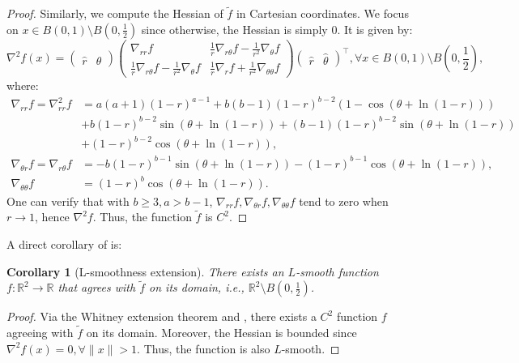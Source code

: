 \documentclass{article}
\theoremstyle{plain}
\newtheorem{corollary}[theorem]{Corollary}
\theoremstyle{definition}
\theoremstyle{remark}
\newcommand*{\RR}{\mathbb{R}}
\begin{document}
\begin{proof}
    Similarly, we compute the Hessian of $\tilde{f}$ in Cartesian coordinates.
    We focus on $x \in B(0,1) \setminus B\left(0, \frac{1}{2}\right)$ since otherwise, the Hessian is simply $0$. It is given by:
    \begin{equation*}
        \nabla^2 f(x) = \begin{pmatrix}
            \hat{r} & \hat{\theta}
        \end{pmatrix} \begin{pmatrix}
            \nabla_{rr} f & \frac{1}{r} \nabla_{r\theta} f - \frac{1}{r^2} \nabla_\theta f\\
            \frac{1}{r} \nabla_{r\theta} f - \frac{1}{r^2} \nabla_\theta f & \frac{1}{r} \nabla_r f + \frac{1}{r^2}\nabla_{\theta\theta} f
        \end{pmatrix}\begin{pmatrix}
            \hat{r} & \hat{\theta}
        \end{pmatrix}^\top,\forall x \in B(0,1) \setminus B\left(0, \frac{1}{2}\right),
    \end{equation*}
    where:
    \begin{equation*}
        \begin{aligned}
            \nabla_{rr} f = \nabla_{rr}^2 f &= a(a+1)(1-r)^{a - 1} + b(b-1)(1-r)^{b - 2}(1 - \cos(\theta + \ln(1-r)))\\ 
            &+ b(1-r)^{b-2}\sin(\theta + \ln(1-r)) + (b-1)(1-r)^{b-2}\sin(\theta + \ln(1 - r))\\
            &+ (1-r)^{b-2}\cos(\theta + \ln(1-r)),\\
            \nabla_{\theta r} f = \nabla_{r\theta} f &= -b(1-r)^{b-1}\sin(\theta + \ln(1-r)) - (1-r)^{b-1}\cos(\theta + \ln(1-r)),\\
            \nabla_{\theta\theta} f &= (1-r)^b \cos(\theta + \ln(1-r)).
        \end{aligned}
    \end{equation*}
    One can verify that with $b \geq 3, a > b - 1$, $\nabla_{rr} f, \nabla_{\theta r} f, \nabla_{\theta\theta} f$ tend to zero when $r \to 1$, hence $\nabla^2 f$. Thus, the function $\tilde{f}$ is $C^2$. 
\end{proof}

A direct corollary of  is:
\begin{corollary}[L-smoothness extension]\label{cor:L-smoothness}
    There exists an $L$-smooth function $f: \RR^2 \to \RR$ that agrees with $\tilde{f}$ on its domain, i.e., $\RR^2 \setminus B\left(0,\frac{1}{2}\right)$. 
\end{corollary}
\begin{proof}
    Via the Whitney extension theorem \citep{whitney1934analytic} and , there exists a $C^2$ function $f$ agreeing with $\tilde{f}$ on its domain. Moreover, the Hessian is bounded since $\nabla^2 f (x) = 0, \forall \|x\| > 1$. Thus, the function is also $L$-smooth.
\end{proof}
\end{document}
